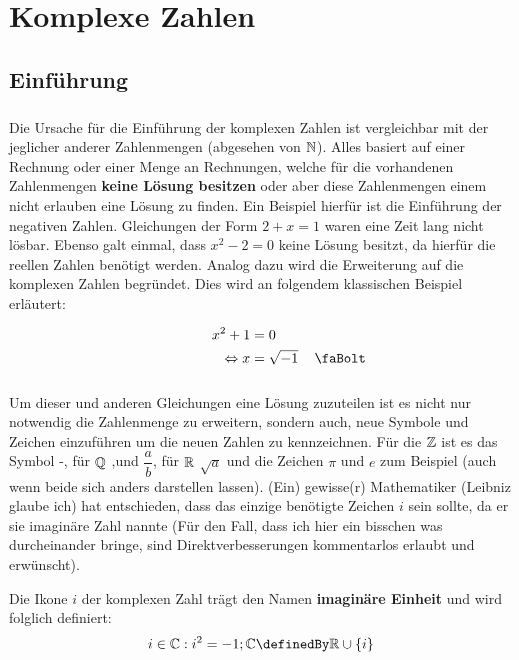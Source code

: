 \documentclass[main.tex]{subfiles}
\begin{document}
\chapter{Komplexe Zahlen}


\section{Einführung}

	\paragraph{} Die Ursache für die Einführung der komplexen Zahlen ist vergleichbar mit der jeglicher anderer Zahlenmengen (abgesehen
	von $\mathbb{N}$). Alles basiert auf einer Rechnung oder einer Menge an Rechnungen, welche für die vorhandenen Zahlenmengen \textbf{keine Lösung besitzen} oder aber diese Zahlenmengen einem nicht erlauben eine Lösung zu finden. Ein Beispiel hierfür ist die Einführung der
	negativen Zahlen. Gleichungen der Form $2 + x = 1$ waren eine Zeit lang nicht lösbar. Ebenso galt einmal, dass $x^2 - 2 = 0$ keine
	Lösung besitzt, da hierfür die reellen Zahlen benötigt werden. Analog dazu wird die Erweiterung auf die komplexen Zahlen begründet.
	Dies wird an folgendem klassischen Beispiel erläutert:

	\begin{align*}
		\qquad \qquad x^2 + 1 &= 0 \\
			\Leftrightarrow x &= \sqrt{-1} \quad \text{\lightning}
	\end{align*}

	\paragraph{} Um dieser und anderen Gleichungen eine Lösung zuzuteilen ist es nicht nur notwendig die Zahlenmenge zu erweitern, sondern
	auch, neue Symbole und Zeichen einzuführen um die neuen Zahlen zu kennzeichnen. Für die $\mathbb{Z}$ ist es das Symbol \dq-\dq, für $\mathbb{Q}$
	\dq,\dq und $\dfrac{a}{b}$, für $\mathbb{R}$ $\sqrt{a}$ und die Zeichen $\pi$ und $e$ zum Beispiel (auch wenn beide sich anders darstellen lassen). (Ein) gewisse(r) Mathematiker (Leibniz glaube ich) hat entschieden, dass das einzige benötigte Zeichen $i$ sein sollte, da er sie imaginäre Zahl nannte (Für den Fall, dass ich hier ein bisschen was durcheinander bringe, sind Direktverbesserungen kommentarlos erlaubt und erwünscht).

	\begin{Definition}
		Die Ikone $i$ der komplexen Zahl trägt den Namen \textbf{imaginäre Einheit} und wird folglich definiert:
						$$i \in \C : i^2 = -1; \C \definedBy \R \cup \left\{i\right\}$$

	\end{Definition}
\end{document}
